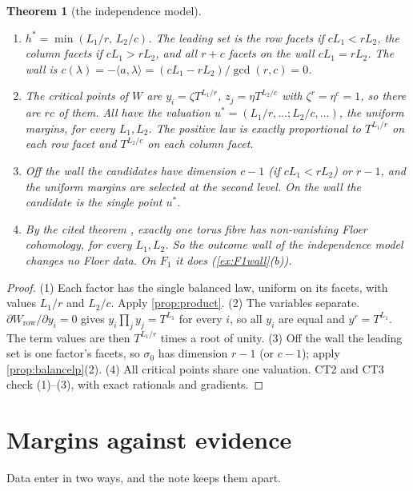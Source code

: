 \documentclass[11pt]{article}
\newtheorem{theorem}{Theorem}\newtheorem{proposition}[theorem]{Proposition}\newtheorem{lemma}[theorem]{Lemma}\newtheorem{corollary}[theorem]{Corollary}\newtheorem{conjecture}[theorem]{Conjecture}\crefname{conjecture}{Conjecture}{Conjectures}
\theoremstyle{definition}\newtheorem{definition}[theorem]{Definition}\newtheorem{remark}[theorem]{Remark}\newtheorem{example}[theorem]{Example}\newtheorem{problem}[theorem]{Open problem}\crefname{problem}{Problem}{Problems}
\begin{document}
\begin{theorem}[the independence model]\label{thm:indep}
\begin{enumerate}
\item[(1)] $h^*=\min(L_1/r,\,L_2/c)$. The leading set is the row facets if $cL_1<rL_2$, the column facets if $cL_1>rL_2$, and all $r+c$ facets on the wall $cL_1=rL_2$.
  The wall is $c(\lambda)=-\langle a,\lambda\rangle=(cL_1-rL_2)/\gcd(r,c)=0$.
\item[(2)] The critical points of $W$ are $y_i=\zeta T^{L_1/r}$, $z_j=\eta T^{L_2/c}$ with $\zeta^r=\eta^c=1$, so there are $rc$ of them. All have the valuation $u^*=(L_1/r,\dots;L_2/c,\dots)$, the
  uniform margins, for every $L_1,L_2$. The positive law is exactly proportional to $T^{L_1/r}$ on each row facet and $T^{L_2/c}$ on each column facet.
\item[(3)] Off the wall the candidates have dimension $c-1$ (if $cL_1<rL_2$) or $r-1$, and the uniform margins are selected at the second level. On the wall the candidate
  is the single point $u^*$.
\item[(4)] By the cited theorem \cite{ChoOh2006}, exactly one torus fibre has non-vanishing Floer cohomology, for every $L_1,L_2$. So the outcome wall of the independence
  model changes no Floer data. On $F_1$ it does (\cref{ex:F1wall}(b)).
\end{enumerate}
\end{theorem}

\begin{proof}
(1) Each factor has the single balanced law, uniform on its facets, with values $L_1/r$ and $L_2/c$. Apply \cref{prop:product}. (2) The variables separate.
$\partial W_{\mathrm{row}}/\partial y_i=0$ gives $y_i\prod_jy_j=T^{L_1}$ for every $i$, so all $y_i$ are equal and $y^r=T^{L_1}$. The term values are then $T^{L_1/r}$ times a root of unity. (3) Off the
wall the leading set is one factor's facets, so $\sigma_0$ has dimension $r-1$ (or $c-1$); apply \cref{prop:balancelp}(2). (4) All critical points share one valuation.
CT2 and CT3 check (1)--(3), with exact rationals and gradients.
\end{proof}

\section{Margins against evidence}\label{sec:margins}
Data enter in two ways, and the note keeps them apart.
\end{document}
